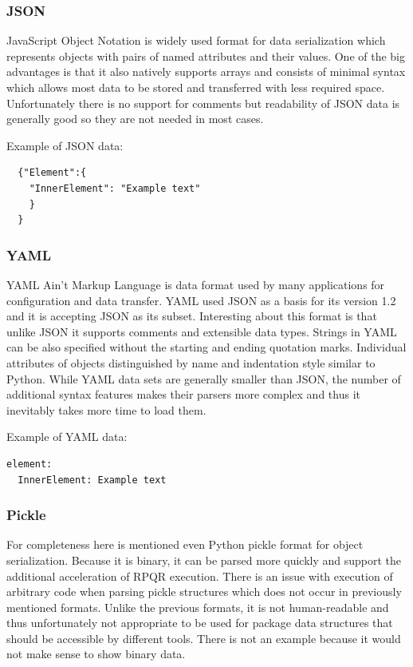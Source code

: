 \subsubsection*{JSON}
JavaScript Object Notation\cite{JSONFormat} is widely used format for data serialization which represents objects
with pairs of named attributes and their values. One of the big advantages is that it also natively
supports arrays and consists of minimal syntax which allows most data to be stored and transferred
with less required space. Unfortunately there is no support for comments but readability of JSON
data is generally good so they are not needed in most cases.

Example of JSON data:
\begin{lstlisting}
  {"Element":{
    "InnerElement": "Example text"
    }
  }
\end{lstlisting}

\subsubsection*{YAML}
YAML\cite{YAMLFormat} Ain't Markup Language is data format used by many applications for configuration and data
transfer. YAML used JSON as a basis for its version 1.2 and it is accepting JSON as its subset.
Interesting about this format is that unlike JSON it supports comments and extensible data types.
Strings in YAML can be also specified without the starting and ending quotation marks. Individual
attributes of objects distinguished by name and indentation style similar to Python. While
YAML data sets are generally smaller than JSON, the number of additional syntax features makes
their parsers more complex and thus it inevitably takes more time to load them.
\newpage

Example of YAML data:
\begin{lstlisting}
element:
  InnerElement: Example text
\end{lstlisting}

\subsubsection*{Pickle}
For completeness here is mentioned even Python pickle format\cite{PickleFormat} for object serialization. Because
it is binary, it can be parsed more quickly and support the additional acceleration of RPQR execution.
There is an issue with execution of arbitrary code when parsing pickle structures which does not
occur in previously mentioned formats. Unlike the previous formats, it is not human-readable
and thus unfortunately not appropriate to be used for package data structures that should be accessible
by different tools.
There is not an example because it would not make sense to show binary data.

